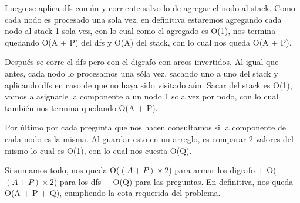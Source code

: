 Luego se aplica dfs común y corriente salvo lo de agregar el nodo al stack. Como cada nodo es procesado una sola vez, en definitiva estaremos agregando cada nodo al stack 1 sola vez, con lo cual como el agregado es O(1), nos termina quedando O(A + P) del dfs y O(A) del stack, con lo cual nos queda O(A + P).\newline

Después se corre el dfs pero con el digrafo con arcos invertidos. Al igual que antes, cada nodo lo procesamos una sóla vez, sacando uno a uno del stack y aplicando dfs en caso de que no haya sido visitado aún. Sacar del stack es O(1), vamos a asignarle la componente a un nodo 1 sola vez por nodo, con lo cual también nos termina quedando O(A + P).\newline

Por último por cada pregunta que nos hacen consultamos si la componente de cada nodo es la misma. Al guardar esto en un arreglo, es comparar 2 valores del mismo lo cual es O(1), con lo cual nos cuesta O(Q).\newline

Si sumamos todo, nos queda O($(A + P) \times 2$) para armar los digrafo + O($(A + P) \times 2$) para los dfs + O(Q) para las preguntas. En definitiva, nos queda O(A + P + Q), cumpliendo la cota requerida del problema.\newline